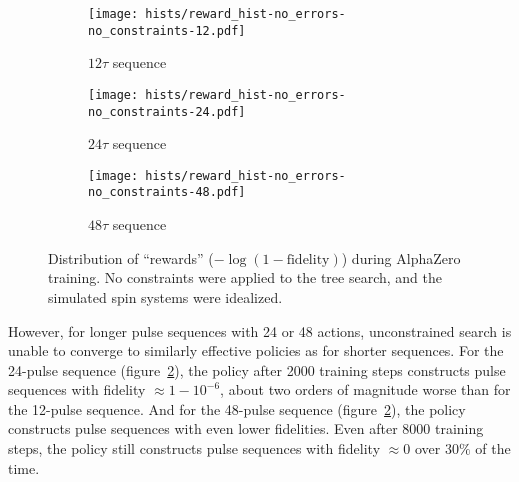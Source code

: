 \begin{figure}[H]
    \centering
    \begin{subfigure}{.49\textwidth}
        \centering
        \texttt{[image: hists/reward\_hist-no\_errors-no\_constraints-12.pdf]}
        \caption{$12\tau$ sequence}
        \label{fig:reward_hist-no_errors-no_constraints-12}
    \end{subfigure}
    \begin{subfigure}{.49\textwidth}
        \centering
        \texttt{[image: hists/reward\_hist-no\_errors-no\_constraints-24.pdf]}
        \caption{$24\tau$ sequence}
        \label{fig:reward_hist-no_errors-no_constraints-24}
    \end{subfigure}
    \begin{subfigure}{.49\textwidth}
        \centering
        \texttt{[image: hists/reward\_hist-no\_errors-no\_constraints-48.pdf]}
        \caption{$48\tau$ sequence}
        \label{fig:reward_hist-no_errors-no_constraints-48}
    \end{subfigure}
    \caption{Distribution of ``rewards'' ($-\log(1 - \text{fidelity})$) during AlphaZero training. No constraints were applied to the tree search, and the simulated spin systems were idealized.}
    \label{fig:reward_hist-no_errors-no_constraints}
\end{figure}

However, for longer pulse sequences with 24 or 48 actions, unconstrained search is unable to converge to similarly effective policies as for shorter sequences. For the 24-pulse sequence (figure~\ref{fig:reward_hist-no_errors-no_constraints-24}), the policy after 2000 training steps constructs pulse sequences with fidelity $\approx 1 - 10^{-6}$, about two orders of magnitude worse than for the 12-pulse sequence.
And for the 48-pulse sequence (figure~\ref{fig:reward_hist-no_errors-no_constraints-24}), the policy constructs pulse sequences with even lower fidelities. Even after 8000 training steps, the policy still constructs pulse sequences with fidelity $\approx 0$ over $30\%$ of the time.

